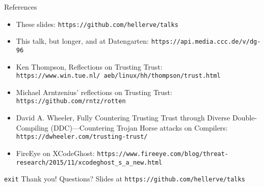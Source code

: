 \documentclass[aspectratio=169]{beamer}
\begin{document}
  \begin{frame}{References}
    \begin{itemize}
      \item These slides: \texttt{https://github.com/hellerve/talks}
      \item This talk, but longer, and at Datengarten: \texttt{https://api.media.ccc.de/v/dg-96}
      \item Ken Thompson, Reflections on Trusting Trust: \texttt{https://www.win.tue.nl/~aeb/linux/hh/thompson/trust.html}
      \item Michael Arntzenius’ reflections on Trusting Trust: \texttt{https://github.com/rntz/rotten}
      \item David A. Wheeler, Fully Countering Trusting Trust through Diverse Double-Compiling (DDC)—Countering Trojan Horse attacks on Compilers: \texttt{https://dwheeler.com/trusting-trust/}
      \item FireEye on XCodeGhost: \texttt{https://www.fireeye.com/blog/threat-research/2015/11/xcodeghost\_s\_a\_new.html}
    \end{itemize}
  \end{frame}
  \begin{frame}{\texttt{exit}}
    \Huge Thank you!
    \linebreak
    \linebreak
    \linebreak
    \small Questions?
    \linebreak
    \linebreak
    \tiny Slides at \texttt{https://github.com/hellerve/talks}
  \end{frame}
\end{document}
